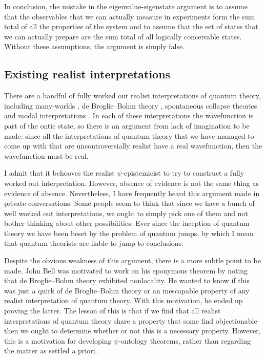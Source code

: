 \documentclass[DIV=calc,paper=a4,fontsize=11pt,twocolumn]{scrartcl} %
\theoremstyle{definition}
\theoremstyle{plain}
\begin{document}
In conclusion, the mistake in the eigenvalue-eigenstate argument is to
assume that the observables that we can actually measure in
experiments form the sum total of all the properties of the system and
to assume that the set of states that we can actually prepare are the
sum total of all logically conceivable states.  Without these
assumptions, the argument is simply false.

\subsection{Existing realist interpretations}

\label{ERI}

There are a handful of fully worked out realist interpretations of
quantum theory, including many-worlds \cite{Everett1957, DeWitt1973,
Wallace2012}, de Broglie--Bohm theory \cite{Broglie2009, Bohm1952,
Bohm1952a, Duerr2009}, spontaneous collapse theories
\cite{Ghirardi1986, Bassi2013} and modal interpretations
\cite{Lombardi2013}.  In each of these interpretations the
wavefunction is part of the ontic state, so there is an argument from
lack of imagination to be made: since all the interpretations of
quantum theory that we have managed to come up with that are
uncontroversially realist have a real wavefunction, then the
wavefunction must be real.

I admit that it behooves the realist $\psi$-epistemicist to try to
construct a fully worked out interpretation.  However, absence of
evidence is not the same thing as evidence of absence.  Nevertheless,
I have frequently heard this argument made in private conversations.
Some people seem to think that since we have a bunch of well worked
out interpretations, we ought to simply pick one of them and not
bother thinking about other possibilities.  Ever since the inception
of quantum theory we have been beset by the problem of quantum jumps,
by which I mean that quantum theorists are liable to jump to
conclusions.

Despite the obvious weakness of this argument, there is a more subtle
point to be made.  John Bell was motivated to work on his eponymous
theorem by noting that de Broglie--Bohm theory exhibited nonlocality.
He wanted to know if this was just a quirk of de Broglie--Bohm theory
or an inescapable property of any realist interpretation of quantum
theory.  With this motivation, he ended up proving the latter.  The
lesson of this is that if we find that all realist interpretations of
quantum theory share a property that some find objectionable then we
ought to determine whether or not this is a necessary property.
However, this is a motivation for developing $\psi$-ontology theorems,
rather than regarding the matter as settled a priori.
\end{document}
